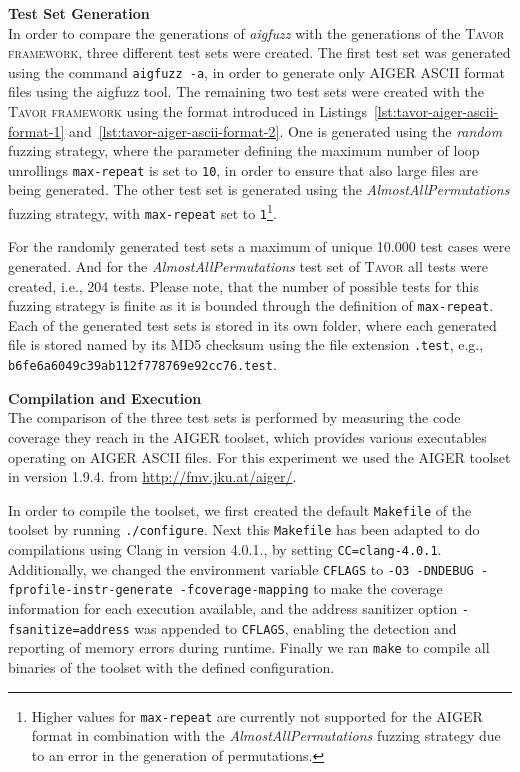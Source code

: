 \textbf{Test Set Generation}\\
In order to compare the generations of \emph{aigfuzz} with the generations of the \textsc{Tavor framework}, three different test sets were created. The first test set was generated using the command \texttt{aigfuzz -a}, in order to generate only AIGER ASCII format files using the aigfuzz tool. The remaining two test sets were created with the \textsc{Tavor framework} using the format introduced in Listings~\ref{lst:tavor-aiger-ascii-format-1} and~\ref{lst:tavor-aiger-ascii-format-2}. One is generated using the \emph{random} fuzzing strategy, where the parameter defining the maximum number of loop unrollings \texttt{max-repeat} is set to \texttt{10}, in order to ensure that also large files are being generated. The other test set is generated using the \emph{AlmostAllPermutations} fuzzing strategy, with \texttt{max-repeat} set to \texttt{1}\footnote{Higher values for \texttt{max-repeat} are currently not supported for the AIGER format in combination with the \emph{AlmostAllPermutations} fuzzing strategy due to an error in the generation of permutations.}.

For the randomly generated test sets a maximum of unique 10.000 test cases were generated. And for the \emph{AlmostAllPermutations} test set of \textsc{Tavor} all tests were created, i.e., 204 tests. Please note, that the number of possible tests for this fuzzing strategy is finite as it is bounded through the definition of \texttt{max-repeat}. Each of the generated test sets is stored in its own folder, where each generated file is stored named by its MD5 checksum using the file extension \texttt{.test}, e.g., \texttt{b6fe6a6049c39ab112f778769e92cc76.test}.

\textbf{Compilation and Execution}\\
The comparison of the three test sets is performed by measuring the code coverage they reach in the AIGER toolset, which provides various executables operating on AIGER ASCII files. For this experiment we used the AIGER toolset in version 1.9.4. from \url{http://fmv.jku.at/aiger/}.

In order to compile the toolset, we first created the default \texttt{Makefile} of the toolset by running \texttt{./configure}. Next this \texttt{Makefile} has been adapted to do compilations using Clang in version 4.0.1., by setting \texttt{CC=clang-4.0.1}. Additionally, we changed the environment variable \texttt{CFLAGS} to \texttt{-O3 -DNDEBUG -fprofile-instr-generate -fcoverage-mapping} to make the coverage information for each execution available, and the address sanitizer option \texttt{-fsanitize=address} was appended to \texttt{CFLAGS}, enabling the detection and reporting of memory errors during runtime. Finally we ran \texttt{make} to compile all binaries of the toolset with the defined configuration.


